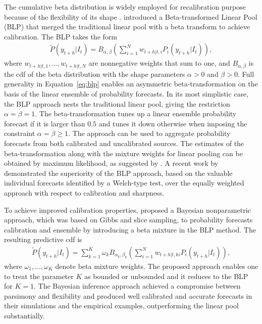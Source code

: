 \documentclass[11pt]{article}
\begin{document}
The cumulative beta distribution is widely employed for recalibration purpose because of the flexibility of its shape \citep[see, e.g.,][]{Graham1996-qc}. \cite{Ranjan2010-jl} introduced a Beta-transformed Linear Pool (BLP) that merged the traditional linear pool with a beta transform to achieve calibration. The BLP takes the form
\begin{align}
\label{eq:blp}
\tilde{P}(y_{t+h}|I_{t}) = B_{\alpha, \beta}\left(\sum_{i=1}^{N} w_{t+h|t,i} P_{i}(y_{t+h}|I_{t})\right),
\end{align}
where $w_{t+h|t,1},\ldots,w_{t+h|t,N}$ are nonnegative weights that sum to one, and $B_{\alpha, \beta}$ is the cdf of the beta distribution with the shape parameters $\alpha > 0$ and $\beta > 0$. Full generality in Equation~\eqref{eq:blp} enables an asymmetric beta-transformation on the basis of the linear ensemble of probability forecasts. In its most simplistic case, the BLP approach nests the traditional linear pool, giving the restriction $\alpha = \beta = 1$. The beta-transformation tunes up a linear ensemble probability forecast if it is larger than $0.5$ and tunes it down otherwise when imposing the constraint $\alpha = \beta \geq 1$. The approach can be used to aggregate probability forecasts from both calibrated and uncalibrated sources. The estimates of the beta-transformation along with the mixture weights for linear pooling can be obtained by maximum likelihood, as suggested by \cite{Ranjan2010-jl}. A recent work by \cite{Lahiri2015-qq} demonstrated the superiority of the BLP approach, based on the valuable individual forecasts identified by a Welch-type test, over the equally weighted approach with respect to calibration and sharpness.

To achieve improved calibration properties, \cite{Bassetti2018-qr} proposed a Bayesian nonparametric approach, which was based on Gibbs and slice sampling, to probability forecasts calibration and ensemble by introducing a beta mixture in the BLP method. The resulting predictive cdf is
\begin{align}
\label{eq:extendblp}
\tilde{P}(y_{t+h}|I_{t}) = \sum_{k=1}^{K} \omega_{k} B_{\alpha_{k}, \beta_{k}}\left(\sum_{i=1}^{N} w_{t+h|t,ki} P_{i}(y_{t+h}|I_{t})\right),
\end{align}
where $\omega_{1}, \ldots, \omega_{K}$ denote beta mixture weights. The proposed approach enables one to treat the parameter $K$ as bounded or unbounded and it reduces to the BLP for $K=1$. The Bayesian inference approach achieved a compromise between parsimony and flexibility and produced well calibrated and accurate forecasts in their simulations and the empirical examples, outperforming the linear pool substantially.
\end{document}
